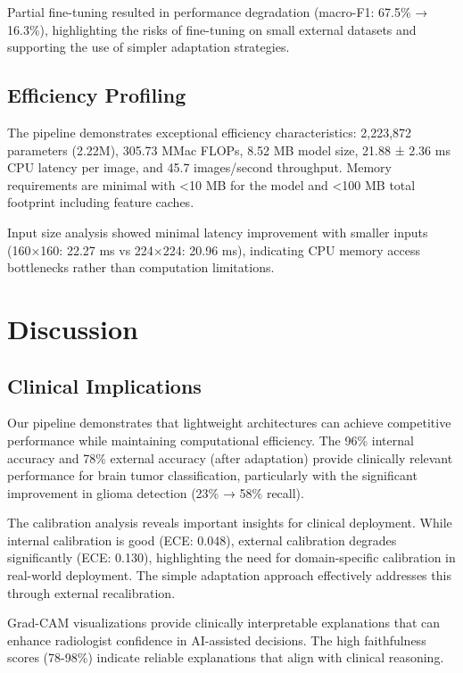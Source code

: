 \documentclass[11pt,a4paper]{article}
\begin{document}
Partial fine-tuning resulted in performance degradation (macro-F1: 67.5\% → 16.3\%), highlighting the risks of fine-tuning on small external datasets and supporting the use of simpler adaptation strategies.

\subsection{Efficiency Profiling}

The pipeline demonstrates exceptional efficiency characteristics: 2,223,872 parameters (2.22M), 305.73 MMac FLOPs, 8.52 MB model size, 21.88 ± 2.36 ms CPU latency per image, and 45.7 images/second throughput. Memory requirements are minimal with <10 MB for the model and <100 MB total footprint including feature caches.

Input size analysis showed minimal latency improvement with smaller inputs (160×160: 22.27 ms vs 224×224: 20.96 ms), indicating CPU memory access bottlenecks rather than computation limitations.

\section{Discussion}

\subsection{Clinical Implications}

Our pipeline demonstrates that lightweight architectures can achieve competitive performance while maintaining computational efficiency. The 96\% internal accuracy and 78\% external accuracy (after adaptation) provide clinically relevant performance for brain tumor classification, particularly with the significant improvement in glioma detection (23\% → 58\% recall).

The calibration analysis reveals important insights for clinical deployment. While internal calibration is good (ECE: 0.048), external calibration degrades significantly (ECE: 0.130), highlighting the need for domain-specific calibration in real-world deployment. The simple adaptation approach effectively addresses this through external recalibration.

Grad-CAM visualizations provide clinically interpretable explanations that can enhance radiologist confidence in AI-assisted decisions. The high faithfulness scores (78-98\%) indicate reliable explanations that align with clinical reasoning.
\end{document}
